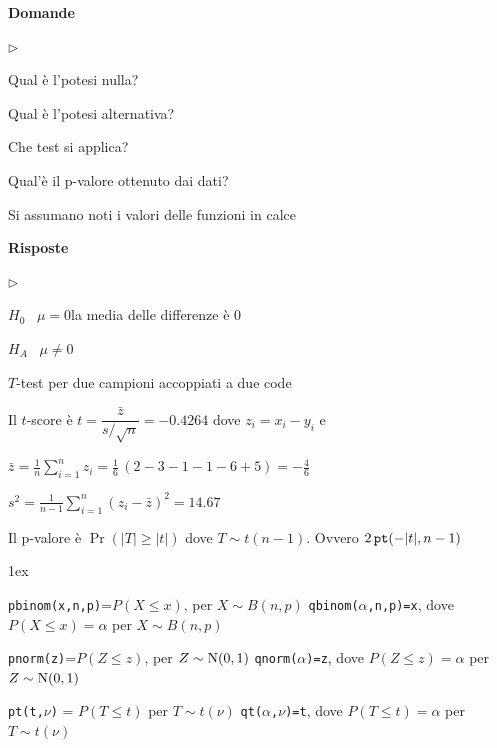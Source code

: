 \documentclass[11pt,openany]{book}
\newcommand{\mylabel}[1]{{\footnotesize\textsf{#1}}\hfill}
\renewenvironment{itemize}
  {\begin{list}{$\triangleright$}{%
   \setlength{\parskip}{0mm}
   \setlength{\topsep}{.2\baselineskip}
   \setlength{\rightmargin}{0mm}
   \setlength{\listparindent}{0mm}
   \setlength{\itemindent}{0mm}
   \setlength{\labelwidth}{3ex}
   \setlength{\itemsep}{.4\baselineskip}
   \setlength{\parsep}{0mm}
   \setlength{\partopsep}{0mm}
   \setlength{\labelsep}{1ex}
   \setlength{\leftmargin}{\labelwidth+\labelsep}
   \let\makelabel\mylabel}}{%
   \end{list}\vspace*{-1.3mm}}
\begin{document}
\textbf{Domande}

\begin{itemize}
  \item[1.] Qual è l'potesi nulla?
  
  \item[2.] Qual è l'potesi alternativa?
  
  \item[3.] Che test si applica?
  
  \item[4.] Qual'è il p-valore ottenuto dai dati?
  \end{itemize}
  
  Si assumano noti i valori delle funzioni in calce
  
  \textbf{Risposte}

\begin{itemize}
\item[1.] $H_0$ \ $\mu = 0$\hfill la media delle differenze è $0$

\item[2.] $H_A$ \ $\mu\neq0$

\item[3.] $T$-test per due campioni accoppiati a due code

\item[4.] Il $t$-score è 
$t = \dfrac{\bar z}{s/\sqrt{n}}= -0.4264$ dove $z_i=x_i-y_i$ e

$\displaystyle\bar z = \frac1{n}\sum^n_{i=1}z_i=\frac16\,(2-3-1-1-6+5)=-\frac46$

$\displaystyle s^2= \frac1{n-1}\sum^n_{i=1}(z_i-\bar z)^2=14.67$

\item[4.] Il p-valore è $\Pr(|T|\ge |t|)$ dove $T\sim t(n-1)$.
Ovvero $2\,{\tt pt}(-|t|, n-1)$
\end{itemize}





\vfill
\parskip1ex
{\hrulefill\scriptsize


{\tt pbinom(x,n,p)}=$P(X\le x)$, per $X\sim B(n,p)$
\hfill 
{\tt qbinom($\alpha$,n,p)=x},  dove $P(X\le x)=\alpha$ per $X\sim B(n,p)$

{\tt pnorm(z)}=$P(Z\le z)$, per $Z\sim {\rm N}(0,1)$
\hfill 
{\tt qnorm($\alpha$)=z},  dove $P(Z\le z)=\alpha$ per $Z\sim {\rm N}(0,1)$

{\tt pt(t,$\nu$)} = $P(T\le t)$ per $T\sim t(\nu)$
\hfill
{\tt qt($\alpha$,$\nu$)=t}, dove $P(T\le t)=\alpha$ per $T\sim t(\nu)$

}
\end{document}
